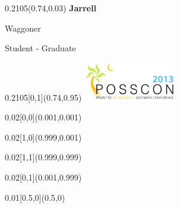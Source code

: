 \documentclass[a4paper]{article}
\begin{document}
\begin{textblock}{0.2105}(0.74,0.03)
  {\fontsize{36}{40} \textbf{Jarrell} } \\
  \begin{Large} Waggoner \end{Large}

  \vspace{2em}

  Student - Graduate
\end{textblock}

\begin{textblock}{0.2105}[0,1](0.74,0.95)
  \includegraphics[width=4cm]{fig/logo}
\end{textblock}


\begin{textblock}{0.02}[0,0](0.001,0.001)
\end{textblock}

\begin{textblock}{0.02}[1,0](0.999,0.001)
\end{textblock}

\begin{textblock}{0.02}[1,1](0.999,0.999)
\end{textblock}

\begin{textblock}{0.02}[0,1](0.001,0.999)
\end{textblock}

\begin{textblock}{0.01}[0.5,0](0.5,0) 
\end{textblock}
\end{document}
